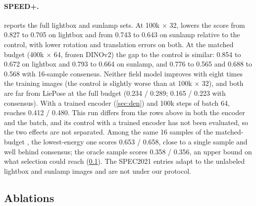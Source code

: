 \paragraph{SPEED+.}
 reports the full lightbox and sunlamp sets. At 100k $\times$ 32, \method lowers the score from 0.827 to
0.705 on lightbox and from 0.743 to 0.643 on sunlamp relative to the control, with lower rotation and translation errors on both.
At the matched budget (400k $\times$ 64, frozen DINOv2) the gap to the control is similar: 0.854 to 0.672 on lightbox and 0.793 to 0.664 on sunlamp, and 0.776 to 0.565 and 0.688 to 0.568 with 16-sample consensus. Neither field model improves with eight times the training images (the control is slightly worse than at 100k $\times$ 32), and both are far from LiePose at the full budget (0.234 / 0.289; 0.165 / 0.223 with consensus). With a trained encoder (\cref{sec:den}) and 100k steps of batch 64,
\method reaches 0.412 / 0.480. This run differs from the rows above in both the encoder and the batch, and its control with a trained
encoder has not been evaluated, so the two effects are not separated. Among the same 16 samples of the matched-budget \method,
the lowest-energy one scores 0.653 / 0.658, close to a single sample and well behind consensus; the oracle sample scores 0.358 /
0.356, an upper bound on what selection could reach (\cref{sec:ablation}). The SPEC2021 entries adapt to the unlabeled lightbox and
sunlamp images and are not under our protocol.

\subsection{Ablations}
\label{sec:ablation}

